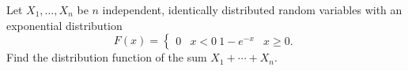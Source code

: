 Let $X_1, \ldots, X_n$ be $n$ independent, identically distributed random variables with an exponential distribution
$$F(x) = \begin{cases} 0 & x < 0 \ 1 - e^{-x} & x \geq 0. \end{cases}$$
Find the distribution function of the sum $X_1 + \cdots + X_n$.
